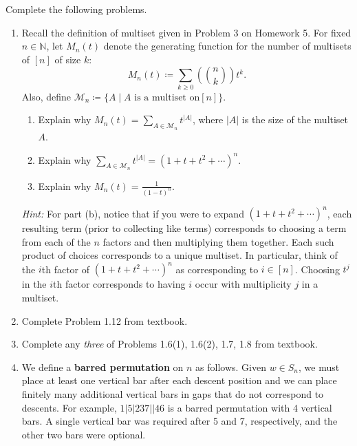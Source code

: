 \documentclass[11pt]{article}%
\theoremstyle{definition}
\newcommand{\stirling}[2]{
  \displaystyle \left\{\begin{matrix}#1  \\#2  \\ \end{matrix}\right\}}
\begin{document}
Complete the following problems. 
\begin{enumerate}
	
\item Recall the definition of multiset given in Problem 3 on Homework 5.  For fixed $n\in \mathbb{N}$, let $M_n(t)$ denote the generating function for the number of multisets of $[n]$ of size $k$:
\[
M_n(t)\coloneqq \sum_{k\geq 0}\left(\binom{n}{k}\right)t^k.
\]
Also, define $\mathcal{M}_n\coloneqq \{A\mid A\text{ is a multiset on}[n]\}$.
\begin{enumerate}
\item Explain why $\displaystyle M_n(t)=\sum_{A\in\mathcal{M}_n} t^{|A|}$, where $|A|$ is the size of the multiset $A$.
\item Explain why $\displaystyle \sum_{A\in\mathcal{M}_n} t^{|A|}=(1+t+t^2+\cdots)^n$.
\item Explain why $\displaystyle M_n(t)=\frac{1}{(1-t)^n}$.
\end{enumerate}
\emph{Hint:} For part (b), notice that if you were to expand $(1+t+t^2+\cdots)^n$, each resulting term (prior to collecting like terms) corresponds to choosing a term from each of the $n$ factors and then multiplying them together.  Each such product of choices corresponds to a unique multiset.  In particular, think of the $i$th factor of $(1+t+t^2+\cdots)^n$ as corresponding to $i\in [n]$.  Choosing $t^j$ in the $i$th factor corresponds to having $i$ occur with multiplicity $j$ in a multiset.
\item Complete Problem 1.12 from textbook.
\item Complete any \emph{three} of Problems 1.6(1), 1.6(2), 1.7, 1.8 from textbook.
\item We define a \textbf{barred permutation} on $n$ as follows.  Given $w\in S_n$, we must place at least one vertical bar after each descent position and we can place finitely many additional vertical bars in gaps that do not correspond to descents.  For example, $1|5|237||46$ is a barred permutation with 4 vertical bars.  A single vertical bar was required after 5 and 7, respectively, and the other two bars were optional.

\end{enumerate}
\end{document}
